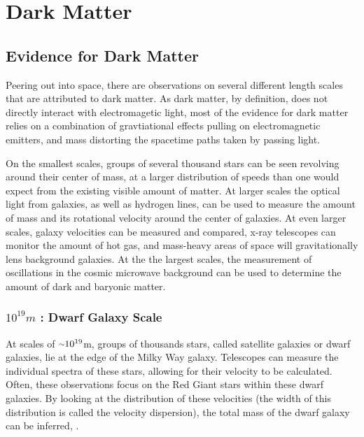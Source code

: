 \cleartooddpage[\thispagestyle{empty}]
\chapter{Dark Matter}

\section{Evidence for Dark Matter}

Peering out into space, there are observations on several different length scales that are attributed to dark matter.
As dark matter, by definition, does not directly interact with electromagetic light, most of the evidence for dark matter relies on a combination of gravtiational effects pulling on electromagnetic emitters, and mass distorting the spacetime paths taken by passing light.

On the smallest scales, groups of several thousand stars can be seen revolving around their center of mass, at a larger distribution of speeds than one would expect from the existing visible amount of matter.
At larger scales the optical light from galaxies, as well as hydrogen lines, can be used to measure the amount of mass and its rotational velocity around the center of galaxies.
At even larger scales, galaxy velocities can be measured and compared, x-ray telescopes can monitor the amount of hot gas, and mass-heavy areas of space will gravitationally lens background galaxies.
At the the largest scales, the measurement of oscillations in the cosmic microwave background can be used to determine the amount of dark and baryonic matter.


\subsection{$10^{19}m$ : Dwarf Galaxy Scale}
At scales of $\nicetilde 10^{19}$m, groups of thousands stars, called satellite galaxies or dwarf galaxies, lie at the edge of the Milky Way galaxy.
Telescopes can measure the individual spectra of these stars, allowing for their velocity to be calculated.
Often, these observations focus on the Red Giant stars within these dwarf galaxies\cite{dwarf_gal_red_giant}.
By looking at the distribution of these velocities (the width of this distribution is called the velocity dispersion), the total mass of the dwarf galaxy can be inferred\cite{dwarf_gal_vel_dispersion}, \cite{dwarf_gal_vel_dispersion2}.

